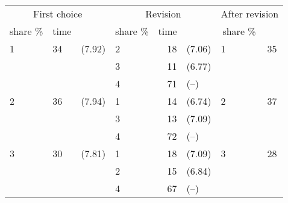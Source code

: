 
\begin{tabular}{llllrlll}
\toprule
\multicolumn{3}{c}{First choice} & \multicolumn{3}{c}{Revision} & \multicolumn{2}{c}{After revision} \\
\cmidrule(l{3pt}r{3pt}){1-3} \cmidrule(l{3pt}r{3pt}){4-6} \cmidrule(l{3pt}r{3pt}){7-8}
\multicolumn{1}{c}{share \%} & \multicolumn{1}{c}{time} & \multicolumn{1}{c}{} & \multicolumn{1}{c}{share \%} & \multicolumn{1}{c}{time} & \multicolumn{1}{c}{} & \multicolumn{1}{c}{share \%} \\
\cmidrule(l{3pt}r{3pt}){1-1} \cmidrule(l{3pt}r{3pt}){2-2} \cmidrule(l{3pt}r{3pt}){4-4} \cmidrule(l{3pt}r{3pt}){5-5} \cmidrule(l{3pt}r{3pt}){7-7}
1 & 34 & (7.92) & 2 & 18 & (7.06) & 1 & 35\\
 &  &  & 3 & 11 & (6.77) &  & \\
 &  &  & 4 & 71 & (--) &  & \\
2 & 36 & (7.94) & 1 & 14 & (6.74) & 2 & 37\\
 &  &  & 3 & 13 & (7.09) &  & \\
\addlinespace
 &  &  & 4 & 72 & (--) &  & \\
3 & 30 & (7.81) & 1 & 18 & (7.09) & 3 & 28\\
 &  &  & 2 & 15 & (6.84) &  & \\
 &  &  & 4 & 67 & (--) &  & \\
\bottomrule
\end{tabular}

